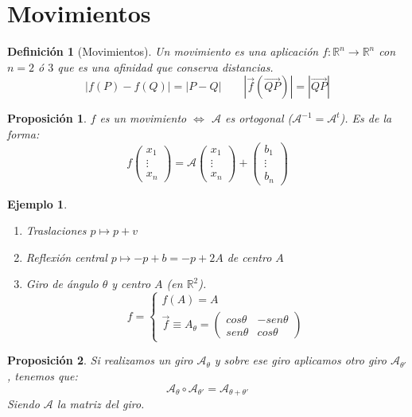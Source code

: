 \documentclass[11pt, a4paper, titlepage]{article}
\newcommand{\R}{\mathbb{R}}
\renewcommand{\vec}{\overrightarrow}
\theoremstyle{theorem-style}
\newtheorem*{nprop}{Proposición}
\theoremstyle{definition-style}
\newtheorem*{ndef}{Definición}
\theoremstyle{remark-style}
\theoremstyle{example-style}
\newtheorem*{ejemplo}{Ejemplo}
\newenvironment{nlist}
{\begin{enumerate}
    \renewcommand\labelenumi{(\emph{\roman{enumi})}}}
  {\end{enumerate}}
\begin{document}
\section{Movimientos}

\begin{ndef}[Movimientos]
  Un movimiento es una aplicación $f:\R^n \to \R^n$ con $n= 2$ ó $3$ que es una afinidad que conserva distancias.
  \[
    |f(P)-f(Q)|= |P-Q| \quad  \quad |\vec{f}(\vec{QP})|= |\vec{QP}|
  \]
\end{ndef}

\begin{nprop}
  $f$ es un movimiento $\iff$ $\mathcal A$ es ortogonal ($\mathcal A ^{-1}= \mathcal A ^t$). Es de la forma:
  \[
    f \begin{pmatrix}
      x_1\\
      \vdots\\
      x_n 
    \end{pmatrix} = \mathcal A \begin{pmatrix}
      x_1\\
      \vdots\\
      x_n 
    \end{pmatrix} + \begin{pmatrix}
      b_1\\
      \vdots\\
      b_n 
    \end{pmatrix}
  \]
\end{nprop}


\begin{ejemplo}
  \begin{nlist}
  \item Traslaciones $p \mapsto p+v$
  \item Reflexión central $p \mapsto -p +b= -p +2A$ de centro $A$
  \item Giro de ángulo $\theta$ y centro $A$ (en $\R^2$).
    \[
      f= \begin{cases}
	f(A) = A \\
	\vec{f} \equiv A_{\theta} = \begin{pmatrix}
          cos \theta & -sen \theta\\
          sen \theta & cos \theta
        \end{pmatrix} 
      \end{cases}
    \]
  \end{nlist}
\end{ejemplo}

\begin{nprop}
  Si realizamos un giro $\mathcal A_\theta$ y sobre ese giro aplicamos otro giro $\mathcal A_{\theta'}$, tenemos que:
  \[
    \mathcal A_{\theta} \circ \mathcal A_{\theta'} = \mathcal A_{\theta+\theta'}
  \]
  Siendo $\mathcal A$ la matriz del giro.
\end{nprop}
\end{document}
